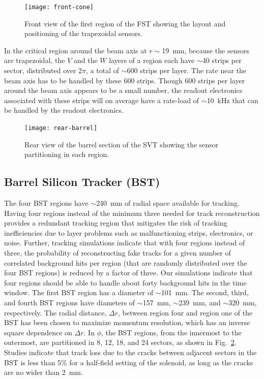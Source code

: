 \begin{figure}[htbp]
\centering
\texttt{[image: front-cone]}
\caption{\small{Front view of the first region of the FST showing the
layout and positioning of the trapezoidal sensors.}}
\label{fig:front-cone}
\end{figure}

In the critical region around the beam axis at $r\sim$19~mm, because the 
sensors are trapezoidal, the $V$ and the $W$ layers of a region each have 
$\sim$40 strips per sector, distributed over 2$\pi$, a total of $\sim$600 
strips per layer.  The rate near the beam axis has to be handled by these 
600 strips.  Though 600 strips per layer around the beam axis appears to be 
a small number, the readout electronics associated with these strips will 
on average have a rate-load of $\sim$10~kHz that can be handled by the 
readout electronics.

\begin{figure}[htbp]
\centering
\texttt{[image: rear-barrel]}
\caption{\small{Rear view of the barrel section of the SVT showing the
sensor partitioning in each region.}}
\label{fig:rear-barrel}
\end{figure}

\subsection{Barrel Silicon Tracker (BST)}

The four BST regions have $\sim$240~mm of radial space available for tracking.
Having four regions instead of the minimum three needed for track 
reconstruction provides a redundant tracking region that mitigates the risk of 
tracking inefficiencies due to layer problems such as malfunctioning strips, 
electronics, or noise.  Further, tracking simulations indicate that with four 
regions instead of three, the probability of reconstructing fake tracks for a 
given number of correlated background hits per region (that are randomly 
distributed over the four BST regions) is reduced by a factor of three.  Our 
simulations indicate that four regions should be able to handle about forty 
background hits in the time window.  The first BST region has a diameter of 
$\sim$101~mm.  The second, third, and fourth BST regions have diameters of 
$\sim$157~mm, $\sim$239~mm, and $\sim$320~mm, respectively.  The radial 
distance, $\Delta r$, between region four and region one of the BST has been 
chosen to maximize momentum resolution, which has an inverse square dependence 
on $\Delta r$.  In $\phi$, the BST regions, from the innermost to the 
outermost, are partitioned in 8, 12, 18, and 24 sectors, as shown in 
Fig.~\ref{fig:rear-barrel}.  Studies indicate that track loss due to the 
cracks between adjacent sectors in the BST is less than 5\% for a half-field 
setting of the solenoid, as long as the cracks are no wider than 2~mm.

